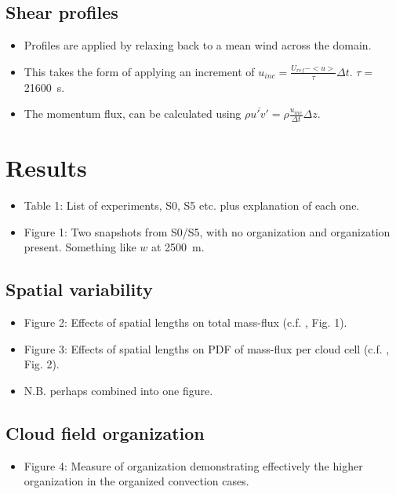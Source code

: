 \documentclass[11pt,a4paper]{article}
\newcommand*\mean[1]{\overline{#1}}
\begin{document}
\subsection{Shear profiles}

\begin{itemize}
    \item Profiles are applied by relaxing back to a mean wind across the domain.
    \item This takes the form of applying an increment of $u_{inc} = \frac{U_{ref} - <u>}{\tau} \Delta t$. $\tau = $ \SI{21600}{s}.
    \item The momentum flux, can be calculated using $\rho \mean{u' v'} = \rho \frac{u_{inc}}{\Delta t} \Delta z$.
\end{itemize}

\section{Results}
\begin{itemize}
   \item Table 1: List of experiments, S0, S5 etc. plus explanation of each one.

   \item Figure 1: Two snapshots from S0/S5, with no organization and organization present. Something like $w$ at \SI{2500}{m}.
\end{itemize}

\subsection{Spatial variability}
\begin{itemize}
    \item Figure 2: Effects of spatial lengths on total mass-flux (c.f. \cite{PC2008}, Fig. 1).
    \item Figure 3: Effects of spatial lengths on PDF of mass-flux per cloud cell (c.f. \cite{CC2006II}, Fig. 2).
    \item N.B. perhaps combined into one figure.
\end{itemize}

\subsection{Cloud field organization}
\begin{itemize}
    \item Figure 4: Measure of organization demonstrating effectively the higher organization in the organized convection cases.
\end{itemize}
\end{document}
